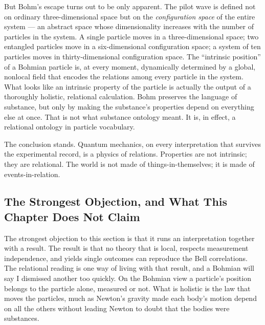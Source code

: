 But Bohm's escape turns out to be only apparent. The pilot wave is defined not on ordinary three-dimensional space but on the \emph{configuration space} of the entire system --- an abstract space whose dimensionality increases with the number of particles in the system. A single particle moves in a three-dimensional space; two entangled particles move in a six-dimensional configuration space; a system of ten particles moves in thirty-dimensional configuration space. The ``intrinsic position'' of a Bohmian particle is, at every moment, dynamically determined by a global, nonlocal field that encodes the relations among every particle in the system. What looks like an intrinsic property of the particle is actually the output of a thoroughly holistic, relational calculation. Bohm preserves the language of substance, but only by making the substance's properties depend on everything else at once. That is not what substance ontology meant. It is, in effect, a relational ontology in particle vocabulary.

The conclusion stands. Quantum mechanics, on every interpretation that survives the experimental record, is a physics of relations. Properties are not intrinsic; they are relational. The world is not made of things-in-themselves; it is made of events-in-relation.

\subsection*{The Strongest Objection, and What This Chapter Does Not Claim}

The strongest objection to this section is that it runs an interpretation together with a result. The result is that no theory that is local, respects measurement independence, and yields single outcomes can reproduce the Bell correlations. The relational reading is one way of living with that result, and a Bohmian will say I dismissed another too quickly. On the Bohmian view a particle's position belongs to the particle alone, measured or not. What is holistic is the law that moves the particles, much as Newton's gravity made each body's motion depend on all the others without leading Newton to doubt that the bodies were substances.

